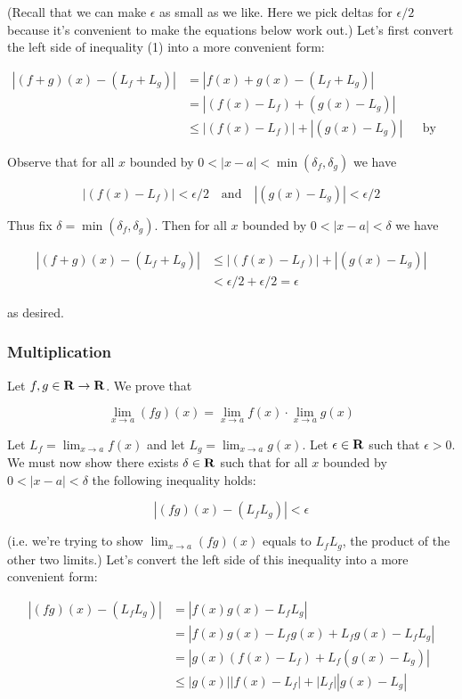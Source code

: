 (Recall that we can make $\epsilon$ as small as we like. Here we pick deltas
for $\epsilon/2$ because it's convenient to make the equations below work
out.) Let's first convert the left side of inequality (1) into a more
convenient form:

\begin{align*}
    |(f+g)(x)-(L_f+L_g)|&=|f(x)+g(x)-(L_f+L_g)|\\
    &=|(f(x)-L_f)+(g(x)-L_g)|\\
    &\leq |(f(x)-L_f)|+|(g(x)-L_g)|&&\text{by triangle inequality}
\end{align*}

Observe that for all $x$ bounded by $0<|x-a|<\min(\delta_f, \delta_g)$ we have

\[|(f(x)-L_f)|<\epsilon/2 \ \ \ \text{ and }\ \ \  |(g(x)-L_g)|<\epsilon/2\]

Thus fix $\delta=\min(\delta_f, \delta_g)$. Then for all $x$ bounded by
$0<|x-a|<\delta$ we have

\begin{align*}
    |(f+g)(x)-(L_f+L_g)|&\leq |(f(x)-L_f)|+|(g(x)-L_g)|\\
    &<\epsilon/2+\epsilon/2=\epsilon
\end{align*}

as desired.

\subsubsection{Multiplication}

Let $f,g\in\mathbf{R}\to\mathbf{R}$. We prove that

\[\lim_{x\to a}(fg)(x)=\lim_{x\to a}f(x)\cdot\lim_{x\to a}g(x)\]

Let $L_f=\lim_{x\to a}f(x)$ and let $L_g=\lim_{x\to a}g(x)$. Let
$\epsilon\in\mathbf{R}$ such that $\epsilon>0$. We must now show there exists
$\delta\in\mathbf{R}$ such that for all $x$ bounded by $0<|x-a|<\delta$ the following
inequality holds:

\[|(fg)(x)-(L_fL_g)|<\epsilon\]

(i.e. we're trying to show $\lim_{x\to a}(fg)(x)$ equals to $L_fL_g$,
the product of the other two limits.) Let's convert the left side of
this inequality into a more convenient form:

\begin{align*}
    |(fg)(x)-(L_fL_g)|&=|f(x)g(x)-L_fL_g|\\
    &=|f(x)g(x)-L_fg(x)+L_fg(x)-L_fL_g|\\
    &=|g(x)(f(x)-L_f)+L_f(g(x)-L_g)|\\
    &\leq |g(x)||f(x)-L_f|+|L_f||g(x)-L_g|
\end{align*}

